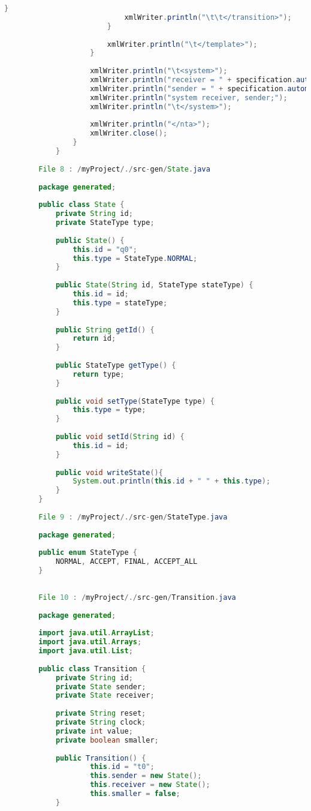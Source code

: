 \begin{lstlisting}[language=java, caption={példa unit teszteset.},captionpos=b]
							}
							xmlWriter.println("\t\t</transition>");
						}
						
						xmlWriter.println("\t</template>");
					}
					
					xmlWriter.println("\t<system>");
					xmlWriter.println("receiver = " + specification.automatas.get(0).getId() + "();");
					xmlWriter.println("sender = " + specification.automatas.get(0).getId() + "_environment();");
					xmlWriter.println("system receiver, sender;");
					xmlWriter.println("\t</system>");
					
					xmlWriter.println("</nta>");
					xmlWriter.close();
				}
			}
		
		File 8 : /myProject/./src-gen/State.java
		
		package generated;
					
		public class State {
			private String id;
			private StateType type;
		
			public State() {
				this.id = "q0";
				this.type = StateType.NORMAL;
			}
		
			public State(String id, StateType stateType) {
				this.id = id;
				this.type = stateType;
			}
		
			public String getId() {
				return id;
			}
		
			public StateType getType() {
				return type;
			}
		
			public void setType(StateType type) {
				this.type = type;
			}
		
			public void setId(String id) {
				this.id = id;
			}
			
			public void writeState(){
				System.out.println(this.id + " " + this.type);
			}
		}
		
		File 9 : /myProject/./src-gen/StateType.java
		
		package generated;
					
		public enum StateType {
			NORMAL, ACCEPT, FINAL, ACCEPT_ALL
		}
		
		
		File 10 : /myProject/./src-gen/Transition.java
		
		package generated;
		
		import java.util.ArrayList;
		import java.util.Arrays;
		import java.util.List;
		
		public class Transition {
			private String id;
			private State sender;
			private State receiver;
			
			private String reset;
			private String clock;
			private int value;
			private boolean smaller;
			
			public Transition() {
					this.id = "t0";
					this.sender = new State();
					this.receiver = new State();
					this.smaller = false;
			}
		

\end{lstlisting}
